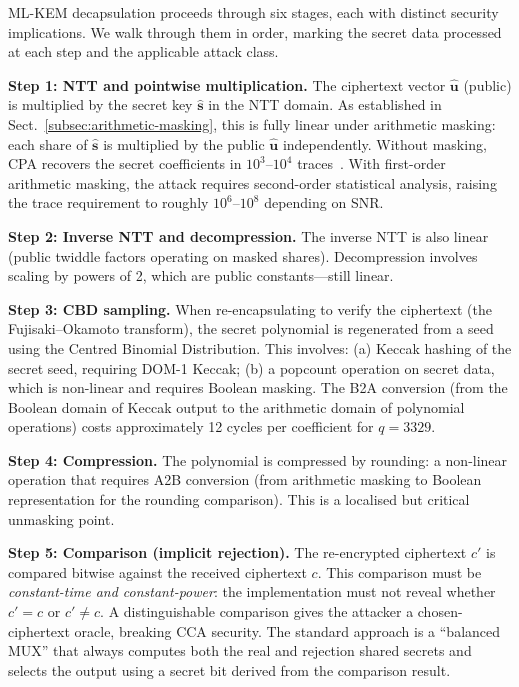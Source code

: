 ML-KEM decapsulation proceeds through six stages, each with distinct security implications.  We walk through them in order, marking the secret data processed at each step and the applicable attack class.

\textbf{Step 1: NTT and pointwise multiplication.}  The ciphertext vector $\hat{\mathbf{u}}$ (public) is multiplied by the secret key $\hat{\mathbf{s}}$ in the NTT domain.  As established in Sect.~\ref{subsec:arithmetic-masking}, this is fully linear under arithmetic masking: each share of $\hat{\mathbf{s}}$ is multiplied by the public $\hat{\mathbf{u}}$ independently.  Without masking, CPA recovers the secret coefficients in $10^3$--$10^4$ traces~\cite{RaviRoyBhasin2020}.  With first-order arithmetic masking, the attack requires second-order statistical analysis, raising the trace requirement to roughly $10^6$--$10^8$ depending on SNR.

\textbf{Step 2: Inverse NTT and decompression.}  The inverse NTT is also linear (public twiddle factors operating on masked shares).  Decompression involves scaling by powers of 2, which are public constants---still linear.

\textbf{Step 3: CBD sampling.}  When re-encapsulating to verify the ciphertext (the Fujisaki--Okamoto transform), the secret polynomial is regenerated from a seed using the Centred Binomial Distribution.  This involves: (a) Keccak hashing of the secret seed, requiring DOM-1 Keccak; (b) a popcount operation on secret data, which is non-linear and requires Boolean masking.  The B2A conversion (from the Boolean domain of Keccak output to the arithmetic domain of polynomial operations) costs approximately 12 cycles per coefficient for $q = 3329$.

\textbf{Step 4: Compression.}  The polynomial is compressed by rounding: a non-linear operation that requires A2B conversion (from arithmetic masking to Boolean representation for the rounding comparison).  This is a localised but critical unmasking point.

\textbf{Step 5: Comparison (implicit rejection).}  The re-encrypted ciphertext $c'$ is compared bitwise against the received ciphertext $c$.  This comparison must be \emph{constant-time and constant-power}: the implementation must not reveal whether $c' = c$ or $c' \neq c$.  A distinguishable comparison gives the attacker a chosen-ciphertext oracle, breaking CCA security.  The standard approach is a ``balanced MUX'' that always computes both the real and rejection shared secrets and selects the output using a secret bit derived from the comparison result.

